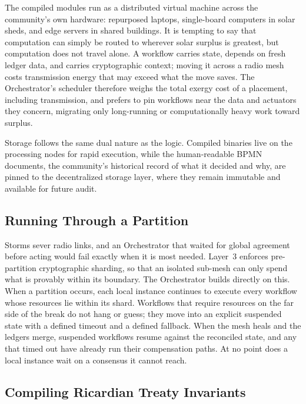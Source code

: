 The compiled modules run as a distributed virtual machine across the community's own hardware: repurposed laptops, single-board computers in solar sheds, and edge servers in shared buildings. It is tempting to say that computation can simply be routed to wherever solar surplus is greatest, but computation does not travel alone. A workflow carries state, depends on fresh ledger data, and carries cryptographic context; moving it across a radio mesh costs transmission energy that may exceed what the move saves. The Orchestrator's scheduler therefore weighs the total exergy cost of a placement, including transmission, and prefers to pin workflows near the data and actuators they concern, migrating only long-running or computationally heavy work toward surplus.

Storage follows the same dual nature as the logic. Compiled binaries live on the processing nodes for rapid execution, while the human-readable BPMN documents, the community's historical record of what it decided and why, are pinned to the decentralized storage layer, where they remain immutable and available for future audit.

\subsection{Running Through a Partition}

Storms sever radio links, and an Orchestrator that waited for global agreement before acting would fail exactly when it is most needed. Layer~3 enforces pre-partition cryptographic sharding, so that an isolated sub-mesh can only spend what is provably within its boundary. The Orchestrator builds directly on this. When a partition occurs, each local instance continues to execute every workflow whose resources lie within its shard. Workflows that require resources on the far side of the break do not hang or guess; they move into an explicit suspended state with a defined timeout and a defined fallback. When the mesh heals and the ledgers merge, suspended workflows resume against the reconciled state, and any that timed out have already run their compensation paths. At no point does a local instance wait on a consensus it cannot reach.

\subsection{Compiling Ricardian Treaty Invariants}

